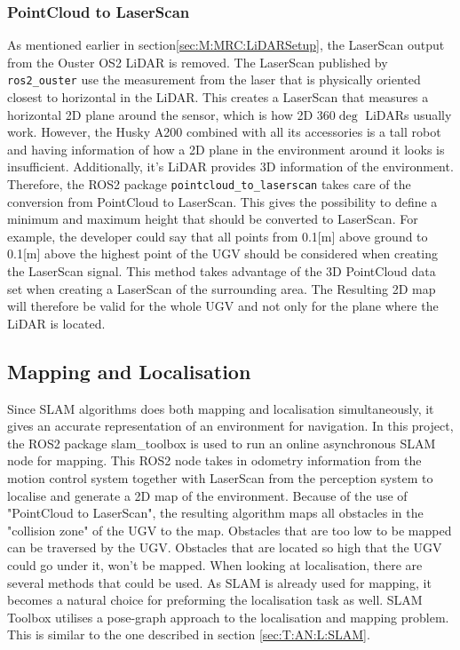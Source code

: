 \subsubsection{PointCloud to LaserScan} \label{sec:M:AN:P:PointCloudToLaserScan}
As mentioned earlier in section\ref{sec:M:MRC:LiDARSetup}, the LaserScan output from the Ouster OS2 LiDAR is removed. The LaserScan published by \lstinline{ros2_ouster} use the measurement from the laser that is physically oriented closest to horizontal in the LiDAR. This creates a LaserScan that measures a horizontal 2D plane around the sensor, which is how 2D $360\deg$ LiDARs usually work. However, the Husky A200 combined with all its accessories is a tall robot and having information of how a 2D plane in the environment around it looks is insufficient. Additionally, it's LiDAR provides 3D information of the environment. Therefore, the ROS2 package \lstinline{pointcloud_to_laserscan} takes care of the conversion from PointCloud to LaserScan. This gives the possibility to define a minimum and maximum height that should be converted to LaserScan. For example, the developer could say that all points from 0.1[m] above ground to 0.1[m] above the highest point of the UGV should be considered when creating the LaserScan signal. This method takes advantage of the 3D PointCloud data set when creating a LaserScan of the surrounding area. The Resulting 2D map will therefore be valid for the whole UGV and not only for the plane where the LiDAR is located.


\subsection{Mapping and Localisation} \label{sec:M:AN:MappingAndLocalization}
 Since SLAM algorithms does both mapping and localisation simultaneously, it gives an accurate representation of an environment for navigation. In this project, the ROS2 package slam\_toolbox is used to run an online asynchronous SLAM node for mapping. This ROS2 node takes in odometry information from the motion control system together with LaserScan from the perception system to localise and generate a 2D map of the environment. Because of the use of "PointCloud to LaserScan", the resulting algorithm maps all obstacles in the "collision zone" of the UGV to the map. Obstacles that are too low to be mapped can be traversed by the UGV. Obstacles that are located so high that the UGV could go under it, won't be mapped. When looking at localisation, there are several methods that could be used. As SLAM is already used for mapping, it becomes a natural choice for preforming the localisation task as well. SLAM Toolbox utilises a pose-graph approach to the localisation and mapping problem. This is similar to the one described in section \ref{sec:T:AN:L:SLAM}.

